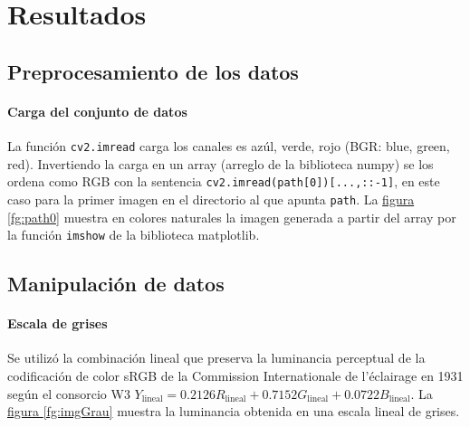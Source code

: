 \documentclass{article}
\begin{document}
\section{Resultados}

\subsection{Preprocesamiento de los datos}

\paragraph{Carga del conjunto de datos} 
La función \verb'cv2.imread' carga los canales es azúl, verde, rojo (BGR: blue, green, red).
Invertiendo la carga en un array (arreglo de la biblioteca numpy) se los ordena como RGB con la sentencia \verb'cv2.imread(path[0])[...,::-1]', en este caso para la primer imagen en el directorio al que apunta \verb'path'.
La \hyperref[fg:path0]{figura \ref*{fg:path0}} muestra en colores naturales la imagen generada a partir del array por la función \verb'imshow' de la biblioteca matplotlib.




\subsection{Manipulación de datos}

\paragraph{Escala de grises}
Se utilizó la combinación lineal que preserva la luminancia perceptual de la codificación de color sRGB de la Commission Internationale de l'éclairage en 1931 según el consorcio W3 \cite{noauthor_standard_1996} $
Y_\mathrm{lineal} = 0.2126 R_\mathrm{lineal} + 0.7152 G_\mathrm{lineal} + 0.0722 B_\mathrm{lineal} .
$
La \hyperref[fg:imgGrau]{figura \ref*{fg:imgGrau}} muestra la luminancia obtenida en una escala lineal de grises.
\end{document}
